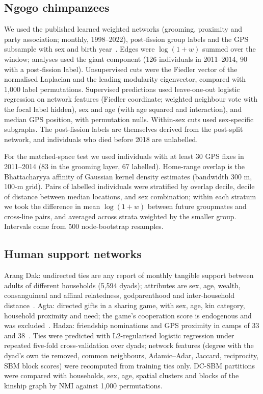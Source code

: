 \documentclass[11pt]{article}
\begin{document}
\subsection{Ngogo chimpanzees}
We used the published learned weighted networks (grooming, proximity and party association; monthly,
1998--2022), post-fission group labels and the GPS subsample with sex and birth year~\cite{Sandel2026,NgogoData}.
Edges were $\log(1+w)$ summed over the window; analyses used the giant component (126 individuals in
2011--2014, 90 with a post-fission label). Unsupervised cuts were the Fiedler vector of the normalised
Laplacian and the leading modularity eigenvector, compared with 1,000 label permutations. Supervised
predictions used leave-one-out logistic regression on network features (Fiedler coordinate; weighted
neighbour vote with the focal label hidden), sex and age (with age squared and interaction), and median
GPS position, with permutation nulls. Within-sex cuts used sex-specific subgraphs. The post-fission
labels are themselves derived from the post-split network, and individuals who died before 2018 are
unlabelled.

For the matched-space test we used individuals with at least 30 GPS fixes in 2011--2014 (83 in the
grooming layer, 67 labelled). Home-range overlap is the Bhattacharyya affinity of Gaussian kernel
density estimates (bandwidth 300 m, 100-m grid). Pairs of labelled individuals were stratified by
overlap decile, decile of distance between median locations, and sex combination; within each stratum we
took the difference in mean $\log(1+w)$ between future groupmates and cross-line pairs, and averaged
across strata weighted by the smaller group. Intervals come from 500 node-bootstrap resamples.

\subsection{Human support networks}
Arang Dak: undirected ties are any report of monthly tangible support between adults of different
households (5,594 dyads); attributes are sex, age, wealth, consanguineal and affinal relatedness,
godparenthood and inter-household distance~\cite{Koster2018,KosterData}. Agta: directed gifts in a sharing game,
with sex, age, kin category, household proximity and need; the game's cooperation score is endogenous
and was excluded~\cite{Smith2018Agta,AgtaData}. Hadza: friendship nominations and GPS proximity in camps of 33 and
38~\cite{Fedurek2024,HadzaData}. Ties were predicted with L2-regularised logistic regression under repeated
five-fold cross-validation over dyads; network features (degree with the dyad's own tie removed, common
neighbours, Adamic--Adar, Jaccard, reciprocity, SBM block scores) were recomputed from training ties
only. DC-SBM partitions were compared with households, sex, age, spatial clusters and blocks of the
kinship graph by NMI against 1,000 permutations.
\end{document}
